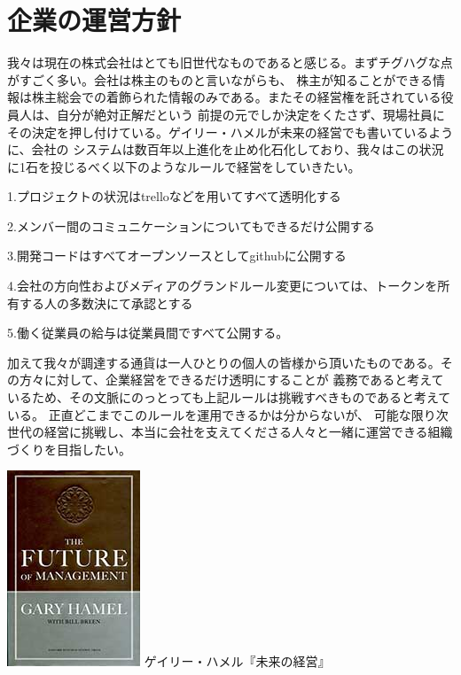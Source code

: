 \documentclass{jsarticle}
\begin{document}
\section{企業の運営方針}
我々は現在の株式会社はとても旧世代なものであると感じる。まずチグハグな点がすごく多い。会社は株主のものと言いながらも、
株主が知ることができる情報は株主総会での着飾られた情報のみである。またその経営権を託されている役員人は、自分が絶対正解だという
前提の元でしか決定をくたさず、現場社員にその決定を押し付けている。ゲイリー・ハメルが未来の経営でも書いているように、会社の
システムは数百年以上進化を止め化石化しており、我々はこの状況に1石を投じるべく以下のようなルールで経営をしていきたい。

1.プロジェクトの状況はtrelloなどを用いてすべて透明化する

2.メンバー間のコミュニケーションについてもできるだけ公開する

3.開発コードはすべてオープンソースとしてgithubに公開する

4.会社の方向性およびメディアのグランドルール変更については、トークンを所有する人の多数決にて承認とする

5.働く従業員の給与は従業員間ですべて公開する。 

加えて我々が調達する通貨は一人ひとりの個人の皆様から頂いたものである。その方々に対して、企業経営をできるだけ透明にすることが
義務であると考えているため、その文脈にのっとっても上記ルールは挑戦すべきものであると考えている。
正直どこまでこのルールを運用できるかは分からないが、
可能な限り次世代の経営に挑戦し、本当に会社を支えてくださる人々と一緒に運営できる組織づくりを目指したい。

\begin{center}
	\includegraphics[scale=0.4]{img/thefutureofmanagement.jpg}
	ゲイリー・ハメル『未来の経営』
\end{center}
\end{document}
